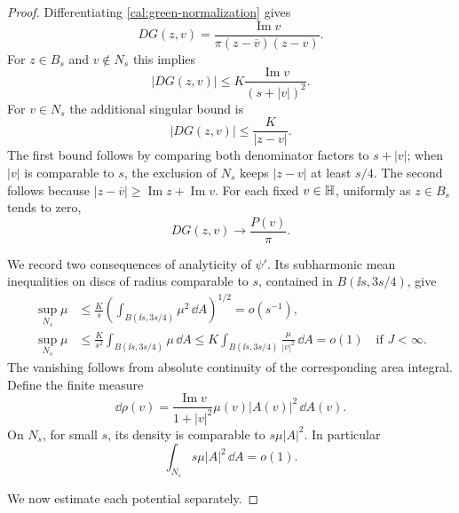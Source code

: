 \begin{proof}
Differentiating \eqref{cal:green-normalization} gives
\begin{equation}
 DG(z,v)=\frac{\operatorname{Im}v}
                    {\pi(z-\overline v)(z-v)}.
 \label{cal:DG-explicit}
\end{equation}
For $z\in B_s$ and $v\notin N_s$ this implies
\begin{equation}
 |DG(z,v)|\leq K\frac{\operatorname{Im}v}{(s+|v|)^2}.
 \label{cal:kernel-far}
\end{equation}
For $v\in N_s$ the additional singular bound is
\begin{equation}
 |DG(z,v)|\leq \frac K{|z-v|}.
 \label{cal:kernel-near}
\end{equation}
The first bound follows by comparing both denominator factors to
$s+|v|$; when $|v|$ is comparable to $s$, the exclusion of $N_s$ keeps
$|z-v|$ at least $s/4$.  The second follows because
$|z-\overline v|\geq\operatorname{Im}z+\operatorname{Im}v$.
For each fixed $v\in\mathbb H$, uniformly as $z\in B_s$ tends to zero,
\begin{equation}
 DG(z,v)\longrightarrow \frac{P(v)}\pi.
 \label{cal:kernel-limit}
\end{equation}

We record two consequences of analyticity of $\psi'$.  Its subharmonic
mean inequalities on discs of radius comparable to $s$, contained in
$B(\ii s,3s/4)$, give
\begin{align}
 \sup_{N_s}\mu
 &\leq\frac K s
    \left(\int_{B(\ii s,3s/4)}\mu^2\,\dd A\right)^{1/2}
       =o(s^{-1}),
 \label{cal:mu-sup-L2}\\
 \sup_{N_s}\mu
 &\leq\frac K{s^2}\int_{B(\ii s,3s/4)}\mu\,\dd A
 \leq K\int_{B(\ii s,3s/4)}\frac\mu{|v|^2}\,\dd A=o(1)
       \quad\text{if }J<\infty.
 \label{cal:mu-sup-J}
\end{align}
The vanishing follows from absolute continuity of the corresponding
area integral.  Define the finite measure
\begin{equation}
 \dd\rho(v)=\frac{\operatorname{Im}v}{1+|v|^2}
                     \mu(v)|A(v)|^2\,\dd A(v).
 \label{cal:rho}
\end{equation}
On $N_s$, for small $s$, its density is comparable to
$s\mu|A|^2$.  In particular
\begin{equation}
 \int_{N_s}s\mu|A|^2\,\dd A=o(1).
 \label{cal:near-bracket-mass}
\end{equation}

We now estimate each potential separately.


\end{proof}
